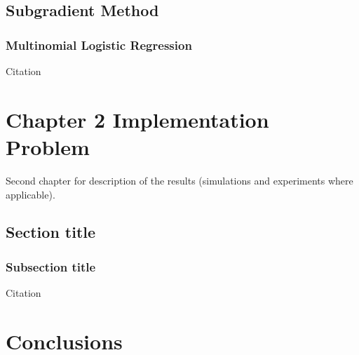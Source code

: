 \documentclass[a4paper,11pt,oneside]{book}
\begin{document}
\section{Subgradient Method}
\subsection {Multinomial Logistic Regression}

Citation \cite{MR-GB:11}

\chapter{Chapter 2 Implementation Problem}
Second chapter for description of the results (simulations and experiments where
applicable).
\section{Section title}
\subsection {Subsection title}

Citation \cite{MR-GB:11}



\chapter*{Conclusions} %


{}

\end{document}
